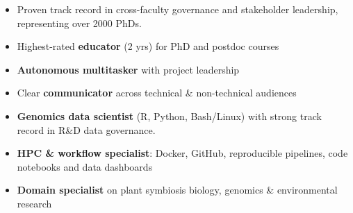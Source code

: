\documentclass[a4paper,10pt]{article}
\begin{document}
{\begin{adjustbox}{valign=t}
\begin{minipage}[t]{0.3\textwidth}
{
\begin{spacing}{1}
\begin{itemize}
  \setlength{\itemindent}{-1em}
  \setlength{\itemsep}{0.0em}
  \item Proven track record in cross-faculty governance and stakeholder leadership, representing over 2000 PhDs.
  \item Highest-rated \textbf{educator} (2 yrs) for PhD and postdoc courses
  \item \textbf{Autonomous multitasker} with project leadership
  \item Clear \textbf{communicator} across technical \& non-technical audiences
  \item \textbf{Genomics data scientist} (R, Python, Bash/Linux) with strong track record in R\&D data governance.
  \item \textbf{HPC \& workflow specialist}: Docker, GitHub, reproducible pipelines, code notebooks and data dashboards
  \item \textbf{Domain specialist} on plant symbiosis biology, genomics \& environmental research
\end{itemize}
\end{spacing}
}




\end{minipage}%
\end{adjustbox}%
\hfill%


\begin{adjustbox}{valign=t}
\hfill%
\begin{minipage}[t]{0.05\textwidth}
\MyVerticalRule
\end{minipage}%
\end{adjustbox}

}
\end{document}
